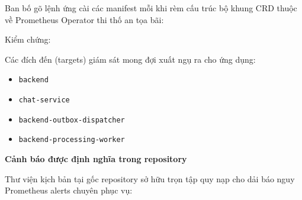 Ban bố gõ lệnh ứng cài các manifest mỗi khi rèm cấu trúc bộ khung CRD
thuộc về Prometheus Operator thi thố an tọa bãi:

\begin{Shaded}
\begin{Highlighting}[]
\end{Highlighting}
\end{Shaded}

Kiểm chứng:

\begin{Shaded}
\begin{Highlighting}[]
  
\end{Highlighting}
\end{Shaded}

Các đích đến (targets) giám sát mong đợi xuất ngụ ra cho ứng dụng:

\begin{itemize}
\tightlist
\item
  \texttt{backend}
\item
  \texttt{chat-\allowbreak{}service}
\item
  \texttt{backend-\allowbreak{}outbox-\allowbreak{}dispatcher}
\item
  \texttt{backend-\allowbreak{}processing-\allowbreak{}worker}
\end{itemize}

\vspace{0.5em}\noindent\textbf{Cảnh báo được định nghĩa trong
repository}\par

Thư viện kịch bản tại gốc repository sở hữu trọn tập quy nạp cho dải báo
nguy Prometheus alerts chuyên phục vụ:

